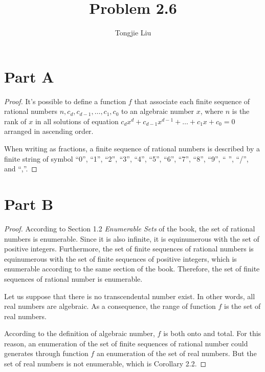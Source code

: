 \documentclass{article}
\title{Problem 2.6}
\author{Tongjie Liu}
\begin{document}
\maketitle


\section{Part A}
\begin{proof}
	It's possible to define a function $f$ that associate each finite
sequence of rational numbers $n, c_d, c_{d - 1}, \ldots, c_1, c_0$ to
an algebraic number $x$, where $n$ is the rank of $x$ in all solutions of
equation $c_d x^d + c_{d - 1} x^{d - 1} + \ldots + c_1 x + c_0 = 0$
arranged in ascending order.

	When writing as fractions, a finite sequence of rational numbers
is described by a finite string of symbol ``0'', ``1'', ``2'', ``3'',
``4'', ``5'', ``6'', ``7'', ``8'', ``9'', `` '', ``/'', and ``,''.
\end{proof}


\section{Part B}
\begin{proof}
	According to Section 1.2 \textit{Enumerable Sets} of the book,
the set of rational numbers is enumerable. Since it is also infinite,
it is equinumerous with the set of positive integers. Furthermore, the
set of finite sequences of rational numbers is equinumerous with the
set of finite sequences of positive integers, which is enumerable according
to the same section of the book. Therefore, the set of finite sequences
of rational number is enumerable.

	Let us suppose that there is no transcendental number exist. In
other words, all real numbers are algebraic. As a consequence, the range
of function $f$ is the set of real numbers.

	According to the definition of algebraic number, $f$ is both onto
and total. For this reason, an enumeration of the set of finite sequences
of rational number could generates through function $f$ an enumeration of
the set of real numbers. But the set of real numbers is not enumerable,
which is Corollary 2.2.
\end{proof}
\end{document}
